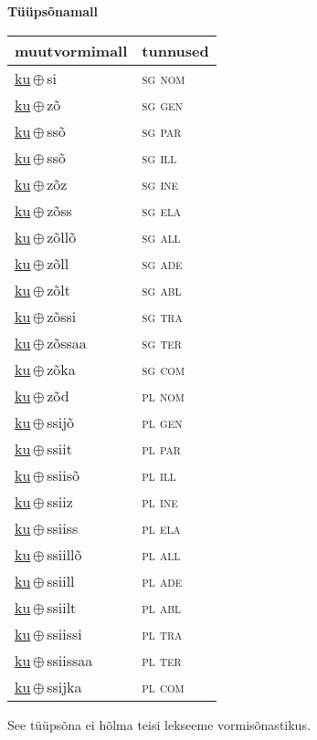 

\vspace{3.5em}
\noindent \begin{minipage}{\textwidth}
\noindent \textbf{Tüüpsõnamall \,}\\

\begin{sideways}
\begin{tabular}{l l}
muutvormimall & tunnused \\
\hline
\underline{ku}\,$\oplus$\,si & \textsc{ sg nom } \\
\underline{ku}\,$\oplus$\,zõ & \textsc{ sg gen } \\
\underline{ku}\,$\oplus$\,ssõ & \textsc{ sg par } \\
\underline{ku}\,$\oplus$\,ssõ & \textsc{ sg ill } \\
\underline{ku}\,$\oplus$\,zõz & \textsc{ sg ine } \\
\underline{ku}\,$\oplus$\,zõss & \textsc{ sg ela } \\
\underline{ku}\,$\oplus$\,zõllõ & \textsc{ sg all } \\
\underline{ku}\,$\oplus$\,zõll & \textsc{ sg ade } \\
\underline{ku}\,$\oplus$\,zõlt & \textsc{ sg abl } \\
\underline{ku}\,$\oplus$\,zõssi & \textsc{ sg tra } \\
\underline{ku}\,$\oplus$\,zõssaa & \textsc{ sg ter } \\
\underline{ku}\,$\oplus$\,zõka & \textsc{ sg com } \\
\underline{ku}\,$\oplus$\,zõd & \textsc{ pl nom } \\
\underline{ku}\,$\oplus$\,ssijõ & \textsc{ pl gen } \\
\underline{ku}\,$\oplus$\,ssiit & \textsc{ pl par } \\
\underline{ku}\,$\oplus$\,ssiisõ & \textsc{ pl ill } \\
\underline{ku}\,$\oplus$\,ssiiz & \textsc{ pl ine } \\
\underline{ku}\,$\oplus$\,ssiiss & \textsc{ pl ela } \\
\underline{ku}\,$\oplus$\,ssiillõ & \textsc{ pl all } \\
\underline{ku}\,$\oplus$\,ssiill & \textsc{ pl ade } \\
\underline{ku}\,$\oplus$\,ssiilt & \textsc{ pl abl } \\
\underline{ku}\,$\oplus$\,ssiissi & \textsc{ pl tra } \\
\underline{ku}\,$\oplus$\,ssiissaa & \textsc{ pl ter } \\
\underline{ku}\,$\oplus$\,ssijka & \textsc{ pl com } \\
\end{tabular}
\end{sideways}
\label{tab:tüüpsõnamall-kusi}

\end{minipage}

 
\vspace{1em}
\noindent See tüüpsõna ei hõlma teisi lekseeme vormi\-sõnastikus.
